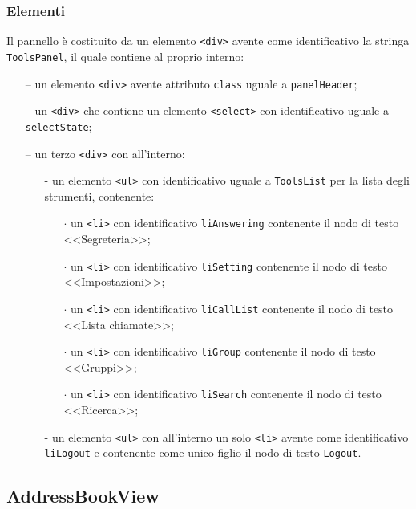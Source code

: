 \subsubsection*{Elementi}
Il pannello è costituito da un elemento \verb'<div>' avente come identificativo la stringa \verb'ToolsPanel', il quale contiene al proprio interno:
\begin{itemize}
  \item[--] un elemento \verb'<div>' avente attributo \verb'class' uguale a \verb'panelHeader';
  \item[--] un \verb'<div>' che contiene un elemento \verb'<select>' con identificativo uguale a \verb'selectState';
  \item[--] un terzo \verb'<div>' con all'interno:
  \begin{itemize}
    \item[-] un elemento \verb'<ul>' con identificativo uguale a \verb'ToolsList' per la lista degli strumenti, contenente:
      \begin{itemize}
        \item[$\cdot$] un \verb'<li>' con identificativo \verb'liAnswering' contenente il nodo di testo <<Segreteria>>;
        \item[$\cdot$] un \verb'<li>' con identificativo \verb'liSetting' contenente il nodo di testo <<Impostazioni>>;
        \item[$\cdot$] un \verb'<li>' con identificativo \verb'liCallList' contenente il nodo di testo  <<Lista chiamate>>;
        \item[$\cdot$] un \verb'<li>' con identificativo \verb'liGroup' contenente il nodo di testo <<Gruppi>>;
        \item[$\cdot$] un \verb'<li>' con identificativo \verb'liSearch' contenente il nodo di testo <<Ricerca>>;
      \end{itemize}
    \item[-] un elemento \verb'<ul>' con all'interno un solo \verb'<li>' avente come identificativo \verb'liLogout' e contenente come unico figlio il nodo di testo \verb'Logout'.
  \end{itemize}
\end{itemize}


\subsection{AddressBookView}
